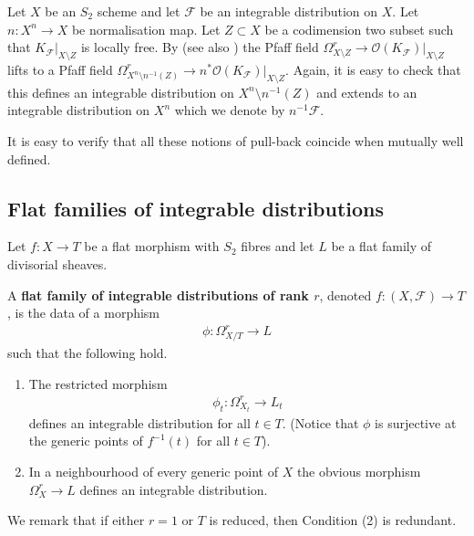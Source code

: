 \documentclass[12pt, a4paper]{amsart}
\theoremstyle{definition}
\theoremstyle{named}
\begin{document}
Let $X$ be an $S_2$ scheme and let $\mathcal F$ be an integrable distribution
on $X$. Let $n\colon X^n \rightarrow X$ be normalisation map. Let $Z \subset X$ be a codimension two subset such that $K_{\mathcal F}|_{X \setminus Z}$ is locally free.
By \cite[Lemma 4.3 and Proposition 4.5]{ADK08} (see also \cite{MR188247}) the Pfaff field $\Omega^r_{X \setminus Z} \rightarrow \mathcal O(K_{\mathcal F})|_{X \setminus Z}$ lifts to a Pfaff field 
$\Omega^r_{X^n \setminus n^{-1}(Z)} \rightarrow n^*\mathcal O(K_{\mathcal F})\vert_{X\setminus Z}$.  Again, it is easy to check that this defines an integrable distribution on 
$X^n \setminus n^{-1}(Z)$ and extends to an integrable distribution 
on $X^n$ which we denote by $n^{-1}\mathcal F$.

It is easy to verify that all these notions of pull-back coincide when mutually well defined.









\subsection{Flat families of integrable distributions}
\label{s_flat_families}
Let $f\colon X \rightarrow T$
be a flat morphism with $S_2$ fibres 
and let $L$ be a flat family of divisorial sheaves.  

A {\bf flat family of integrable distributions of rank $r$},
denoted $f\colon (X, \mathcal F) \rightarrow T$,
is the data of a
morphism \begin{align*}\phi\colon \Omega^r_{X/T} \rightarrow L\end{align*} such that the following hold.
\begin{enumerate}
    \item The restricted morphism \begin{align*}\phi_t\colon \Omega^r_{X_t} \rightarrow L_t\end{align*} defines an integrable distribution for all $t \in T$.
(Notice that $\phi$ is surjective at the generic points of $f^{-1}(t)$ for all $t \in T$).

\item In a neighbourhood of every generic point of $X$ the obvious morphism $\Omega^r_X \to L$ defines an integrable distribution.

\end{enumerate}

We remark that if either $r = 1$ or $T$ is reduced, then Condition (2) is redundant.
\end{document}
